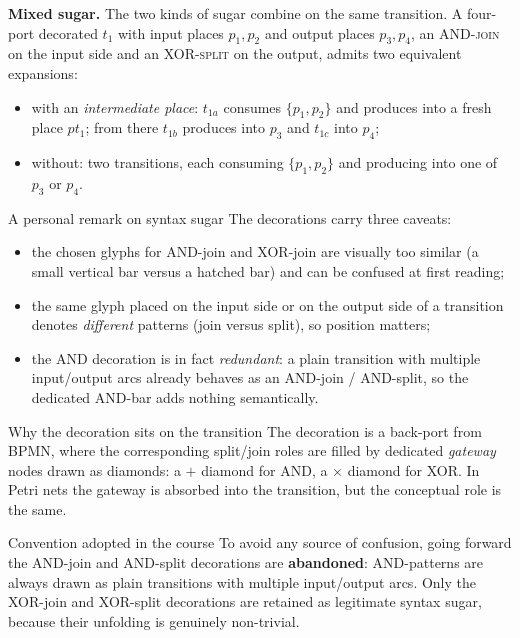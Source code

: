 \textbf{Mixed sugar.} The two kinds of sugar combine on the same transition. A four-port decorated $t_1$ with input places $p_1, p_2$ and output places $p_3, p_4$, an \textsc{AND-join} on the input side and an \textsc{XOR-split} on the output, admits two equivalent expansions:

\begin{itemize}
  \item with an \emph{intermediate place}: $t_{1a}$ consumes $\{p_1, p_2\}$ and produces into a fresh place $pt_1$; from there $t_{1b}$ produces into $p_3$ and $t_{1c}$ into $p_4$;
  \item without: two transitions, each consuming $\{p_1, p_2\}$ and producing into one of $p_3$ or $p_4$.
\end{itemize}

\begin{notebox}{A personal remark on syntax sugar}
The decorations carry three caveats:
\begin{itemize}
  \item the chosen glyphs for AND-join and XOR-join are visually too similar (a small vertical bar versus a hatched bar) and can be confused at first reading;
  \item the same glyph placed on the input side or on the output side of a transition denotes \emph{different} patterns (join versus split), so position matters;
  \item the AND decoration is in fact \emph{redundant}: a plain transition with multiple input/output arcs already behaves as an AND-join / AND-split, so the dedicated AND-bar adds nothing semantically.
\end{itemize}
\end{notebox}

\begin{notebox}{Why the decoration sits on the transition}
The decoration is a back-port from BPMN, where the corresponding split/join roles are filled by dedicated \emph{gateway} nodes drawn as diamonds: a $+$ diamond for AND, a $\times$ diamond for XOR. In Petri nets the gateway is absorbed into the transition, but the conceptual role is the same.
\end{notebox}

\begin{notebox}{Convention adopted in the course}
To avoid any source of confusion, going forward the AND-join and AND-split decorations are \textbf{abandoned}: AND-patterns are always drawn as plain transitions with multiple input/output arcs. Only the XOR-join and XOR-split decorations are retained as legitimate syntax sugar, because their unfolding is genuinely non-trivial.
\end{notebox}

